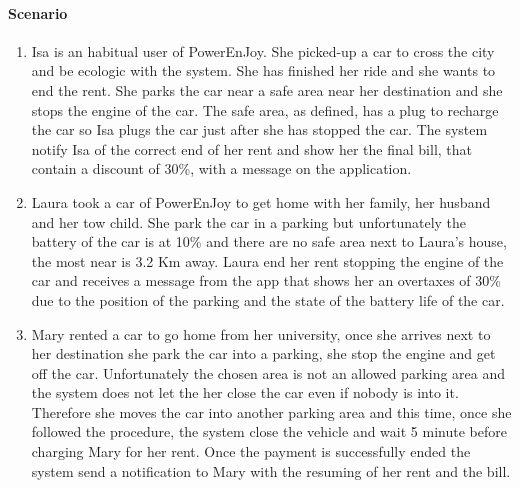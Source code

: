\paragraph{Scenario}
\begin{enumerate}
	\item Isa is an habitual user of PowerEnJoy. She picked-up a car to cross the city and be ecologic with the system. She has finished her ride and she wants to end the rent. She parks the car near a safe area near her destination and she stops the engine of the car. The safe area, as defined, has a plug to recharge the car so Isa plugs the car just after she has stopped the car. The system notify Isa of the correct end of her rent and show her the final bill, that contain a discount of 30\%, with a message on the application.
	\item Laura took a car of PowerEnJoy to get home with her family, her husband and her tow child. She park the car in a parking but unfortunately the battery of the car is at 10\% and there are no safe area next to Laura's house, the most near is 3.2 Km away. Laura end her rent stopping the engine of the car and receives a message from the app that shows her an overtaxes of 30\% due to the position of the parking and the state of the battery life of the car.
	\item Mary rented a car to go home from her university, once she arrives next to her destination she park the car into a parking, she stop the engine and get off the car. Unfortunately the chosen area is not an allowed parking area and the system does not let the her close the car even if nobody is into it. Therefore she moves the car into another parking area and this time, once she followed the procedure, the system close the vehicle and wait 5 minute before charging Mary for her rent. Once the payment is successfully ended the system send a notification to Mary with the resuming of her rent and the bill.
\end{enumerate}
